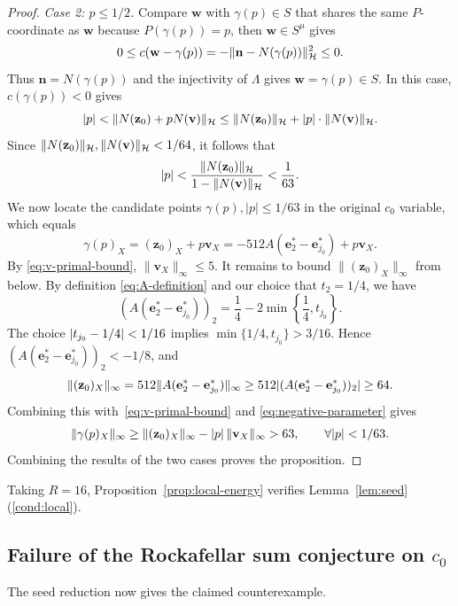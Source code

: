 \documentclass[11pt,a4paper]{article}
\theoremstyle{reportstyle}
\numberwithin{equation}{section}
\newcommand{\HH}{\mathcal H}
\newcommand{\be}{\mathbf e}
\newcommand{\bn}{\mathbf n}
\newcommand{\bv}{\mathbf v}
\newcommand{\bz}{\mathbf z}
\newcommand{\bw}{\mathbf w}
\DeclarePairedDelimiter{\norm}{\lVert}{\rVert}
\DeclarePairedDelimiter{\abs}{\lvert}{\rvert}
\begin{document}
\begin{proof}
		\noindent\emph{Case 2: $p\le1/2$.}
		Compare $\bw$ with $\gamma(p)\in S$ that shares the same $P$-coordinate as $\bw$ because $P(\gamma(p))=p$, then $\bw\in S^\mu$ gives
		$$0\le c(\bw-\gamma(p))	= -\norm{\bn-N(\gamma(p))}_{\HH}^2 \leq 0. $$
		Thus $\bn=N(\gamma(p))$ and the injectivity of $\Lambda$ gives $\bw=\gamma(p)\in S$. In this case, $c(\gamma(p))<0$ gives
		$$ \abs p<\norm{N(\bz_0)+pN(\bv)}_{\HH}
		\le\norm{N(\bz_0)}_{\HH}+\abs p\cdot\norm{N(\bv)}_{\HH}. $$
		Since $\norm{N(\bz_0)}_{\HH},\norm{N(\bv)}_{\HH}<1/64$, it follows that
		\begin{equation}
			\abs p<\frac{\norm{N(\bz_0)}_{\HH}}{1-\norm{N(\bv)}_{\HH}}<\frac1{63}.
			\label{eq:negative-parameter}
		\end{equation}
		We now locate the candidate points $\gamma(p), |p|\leq 1/63$ in the original $c_0$ variable, which equals
		$$\gamma(p)_X = (\bz_0)_X + p\bv_X = -512A(\be_2^*-\be_{j_0}^*) + p\bv_X.$$
		By \eqref{eq:v-primal-bound}, $\|\bv_X\|_\infty\leq 5$.
		It remains to bound $\|(\bz_0)_X\|_\infty$ from below. By definition
		\eqref{eq:A-definition} and our choice that $t_2 = 1/4$, we have
		$$ (A(\be_2^*-\be_{j_0}^*))_2
		=\frac14-2\min\!\left\{\frac14,t_{j_0}\right\}. $$
		The choice $\abs{t_{j_0}-1/4}<1/16$ implies
		$\min\{1/4,t_{j_0}\}>3/16$. Hence $(A(\be_2^*-\be_{j_0}^*))_2<-1/8$, and
		\begin{equation*}
			\norm{(\bz_0)_X}_\infty
			=512\norm{A(\be_2^*-\be_{j_0}^*)}_\infty
			\ge512\abs{(A(\be_2^*-\be_{j_0}^*))_2}\ge64.
		\end{equation*}
		Combining this with~\eqref{eq:v-primal-bound} and
		\eqref{eq:negative-parameter} gives
		\begin{equation*}
			\begin{aligned}
				\norm{\gamma(p)_X}_\infty
				\ge\norm{(\bz_0)_X}_\infty
				-\abs p\,\norm{\bv_X}_\infty > 63,
				\qquad\forall |p|<1/63.
			\end{aligned}
		\end{equation*}
		Combining the results of the two cases proves the proposition.
	\end{proof}

	Taking $R=16$, Proposition~\ref{prop:local-energy} verifies
	Lemma~\ref{lem:seed}\textup{(\ref{cond:local})}.

	\subsection{Failure of the Rockafellar sum conjecture on \texorpdfstring{$c_0$}{c0}}
	\label{subsec:assembly}
	The seed reduction now gives the claimed counterexample.
\end{document}
